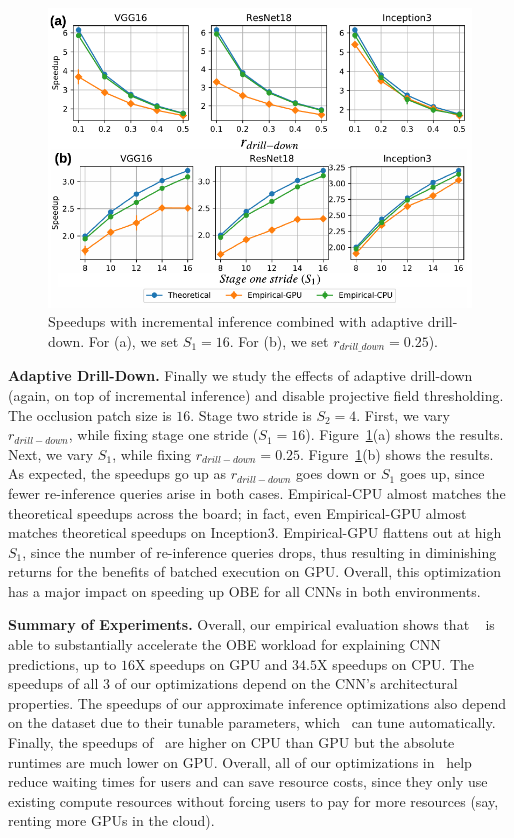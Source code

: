\begin{figure}[t]
\includegraphics[width=\columnwidth]{images/5_2_3_edited}
\vspace{-8mm}
\caption{Speedups with incremental inference combined with adaptive drill-down. For (a), we set $S_1=16$. For (b), we set $r_{drill\_down}=0.25$).}
\vspace{-2mm}
\label{fig:5_2_3_edited}
\end{figure}

\vspace{2mm}
\noindent \textbf{Adaptive Drill-Down.} Finally we study the effects of adaptive drill-down (again, on top of incremental inference) and disable projective field thresholding. The occlusion patch size is $16$. Stage two stride is $S_2 = 4$. First, we vary $r_{drill-down}$, while fixing stage one stride ($S_1 = 16$). Figure~\ref{fig:5_2_3_edited}(a) shows the results. Next, we vary $S_1$, while fixing $r_{drill-down} = 0.25$. Figure~\ref{fig:5_2_3_edited}(b) shows the results. As expected, the speedups go up as $r_{drill-down}$ goes down or $S_1$ goes up, since fewer re-inference queries arise in both cases. Empirical-CPU almost matches the theoretical speedups across the board; in fact, even Empirical-GPU almost matches theoretical speedups on Inception3. Empirical-GPU flattens out at high $S_1$, since the number of re-inference queries drops, thus resulting in diminishing returns for the benefits of batched execution on GPU. Overall, this optimization has a major impact on speeding up OBE for all CNNs in both environments.

\vspace{2mm}
\noindent \textbf{Summary of Experiments.} Overall, our empirical evaluation shows that \system~ is able to substantially accelerate the OBE workload for explaining CNN predictions, up to $16$X speedups on GPU and $34.5$X speedups on CPU. The speedups of all 3 of our optimizations depend on the CNN's architectural properties. The speedups of our approximate inference optimizations also depend on the dataset due to their tunable parameters, which \system ~can tune automatically. Finally, the speedups of \system ~are higher on CPU than GPU but the absolute runtimes are much lower on GPU. Overall, all of our optimizations in \system ~help reduce waiting times for users and can save resource costs, since they only use existing compute resources without forcing users to pay for more resources (say, renting more GPUs in the cloud).